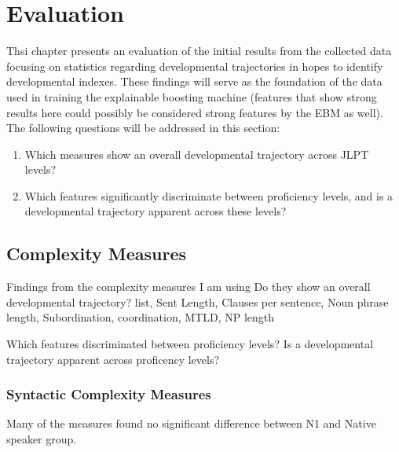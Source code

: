\chapter{Evaluation} 
Thsi chapter presents an evaluation of the initial results from the collected data focusing on statistics regarding
developmental trajectories in hopes to identify developmental indexes. These findings will serve as the foundation
of the data used in training the explainable boosting machine (features that show strong results here could possibly
be considered strong features by the EBM as well). The following questions will be addressed in this
section:

\begin{enumerate}
    \item Which measures show an overall developmental trajectory across JLPT levels?
    \item Which features significantly discriminate between proficiency levels, and is a developmental trajectory
    apparent across these levels?
\end{enumerate}

\section{Complexity Measures}

Findings from the complexity measures I am using
Do they show an overall developmental trajectory?
list, Sent Length, Clauses per sentence, Noun phrase length,  Subordination, coordination, MTLD, NP length

Which features discriminated between proficiency levels?
Is a developmental trajectory apparent across proficency levels?

\subsection{Syntactic Complexity Measures}

Many of the measures found no significant difference between N1 and Native speaker group.

